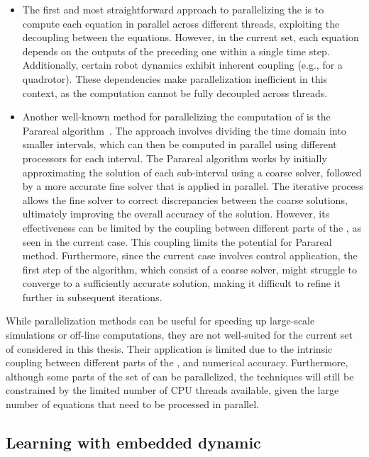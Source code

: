 \begin{itemize}
    \item The first and most straightforward approach to parallelizing the  is to compute each equation in parallel across different threads, exploiting the decoupling between the equations. 
    However, in the current set, each equation depends on the outputs of the preceding one within a single time step.
    Additionally, certain robot dynamics exhibit inherent coupling (e.g., for a quadrotor).
    These dependencies make parallelization inefficient in this context, as the computation cannot be fully decoupled across threads. 
    \item Another well-known method for parallelizing the computation of  is the Parareal algorithm~\cite{cParareal}.
    The approach involves dividing the time domain into smaller intervals, which can then be computed in parallel using different processors for each interval. 
    The Parareal algorithm works by initially approximating the solution of each sub-interval using a coarse solver, followed by a more accurate fine solver that is applied in parallel. 
    The iterative process allows the fine solver to correct discrepancies between the coarse solutions, ultimately improving the overall accuracy of the solution.
    However, its effectiveness can be limited by the coupling between different parts of the , as seen in the current case.
    This coupling limits the potential for Parareal method.
    Furthermore, since the current case involves control application, the first step of the algorithm, which consist of a coarse solver, might struggle to converge to a sufficiently accurate solution, making it difficult to refine it further in subsequent iterations.
\end{itemize}

While  parallelization methods can be useful for speeding up large-scale simulations or off-line computations, they are not well-suited for the current set of  considered in this thesis.
Their application is limited due to the intrinsic coupling between different parts of the , and numerical accuracy. 
Furthermore, although some parts of the set of  can be parallelized, the techniques will still be constrained by the limited number of CPU threads available, given the large number of equations that need to be processed in parallel.

\subsection{Learning with embedded dynamic}

